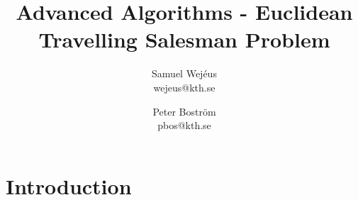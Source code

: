 \documentclass[a4paper,12pt,oneside]{article}
\title{Advanced Algorithms - Euclidean Travelling Salesman Problem}
\author{Samuel Wej\'eus \\ \lowercase{wejeus@kth.se} \and Peter Boström \\ \lowercase{pbos@kth.se} }
\begin{document}
\maketitle

\section{Introduction}

\begin{thebibliography}{9}

\end{thebibliography}
\end{document}
